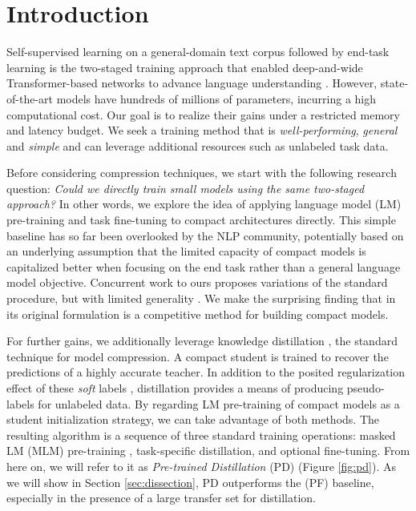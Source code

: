 \section{Introduction}
\label{sec:intro}

Self-supervised learning on a general-domain text corpus followed by end-task learning is the two-staged training approach that enabled deep-and-wide Transformer-based networks \citep{transformer} to advance language understanding \citep{bert, xlnet, ernie, roberta}. However, state-of-the-art models have hundreds of millions of parameters, incurring a high computational cost. Our goal is to realize their gains under a restricted memory and latency budget. We seek a training method that is \emph{well-performing}, \emph{general} and \emph{simple} and can leverage additional resources such as unlabeled task data.

Before considering compression techniques, we start with the following research question: \emph{Could we directly train small models using the same two-staged approach?} In other words, we explore the idea of applying language model (LM) pre-training and task fine-tuning to compact architectures directly. This simple baseline has so far been overlooked by the NLP community, potentially based on an underlying assumption that the limited capacity of compact models is capitalized better when focusing on the end task rather than a general language model objective. Concurrent work to ours proposes variations of the standard \ptft procedure, but with limited generality \citep{patient_kd, distil_bert}. We make the surprising finding that \ptft in its original formulation is a competitive method for building compact models.

For further gains, we additionally leverage knowledge distillation \citep{distillation}, the standard technique for model compression. A compact student is trained to recover the predictions of a highly accurate teacher. In addition to the posited regularization effect of these \emph{soft} labels \citep{distillation}, distillation provides a means of producing pseudo-labels for unlabeled data. By regarding LM pre-training of compact models as a student initialization strategy, we can take advantage of both methods. The resulting algorithm is a sequence of three standard training operations: masked LM (MLM) pre-training \citep{bert}, task-specific distillation, and optional fine-tuning. From here on, we will refer to it as \emph{Pre-trained Distillation} (PD) (Figure \ref{fig:pd}). As we will show in Section \ref{sec:dissection}, PD outperforms the \ptft (PF) baseline, especially in the presence of a large transfer set for distillation.

